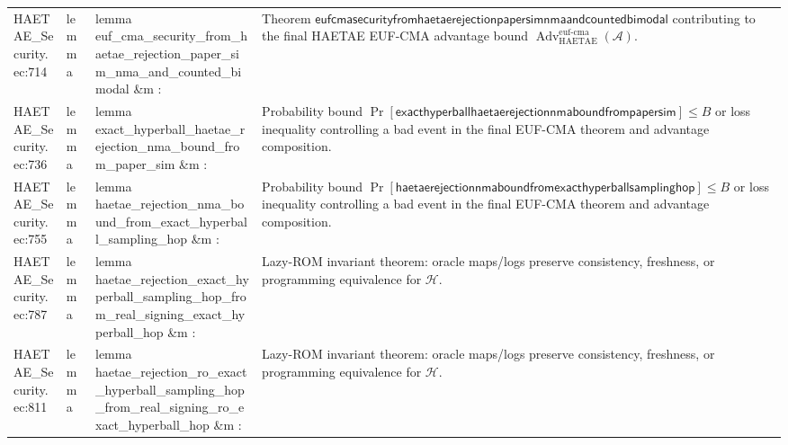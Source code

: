 \documentclass[10pt]{article}
\newcommand{\Adv}{\operatorname{Adv}}
\begin{document}
\begin{longtable}{L{0.11\textwidth}L{0.055\textwidth}L{0.385\textwidth}L{0.41\textwidth}}
HAETAE\_\allowbreak{}Security.\allowbreak{}ec:\allowbreak{}714 & lemma & {\ttfamily\scriptsize lemma euf\_\allowbreak{}cma\_\allowbreak{}security\_\allowbreak{}from\_\allowbreak{}haetae\_\allowbreak{}rejection\_\allowbreak{}paper\_\allowbreak{}sim\_\allowbreak{}nma\_\allowbreak{}and\_\allowbreak{}counted\_\allowbreak{}bimodal \&m :} & Theorem $\mathsf{eufcmasecurityfromhaetaerejectionpapersimnmaandcountedbimodal}$ contributing to the final HAETAE EUF-CMA advantage bound $\Adv_{\mathrm{HAETAE}}^{\mathrm{euf\mbox{-}cma}}(\mathcal A)$. \\
HAETAE\_\allowbreak{}Security.\allowbreak{}ec:\allowbreak{}736 & lemma & {\ttfamily\scriptsize lemma exact\_\allowbreak{}hyperball\_\allowbreak{}haetae\_\allowbreak{}rejection\_\allowbreak{}nma\_\allowbreak{}bound\_\allowbreak{}from\_\allowbreak{}paper\_\allowbreak{}sim \&m :} & Probability bound $\Pr[\mathsf{exacthyperballhaetaerejectionnmaboundfrompapersim}]\le B$ or loss inequality controlling a bad event in the final EUF-CMA theorem and advantage composition. \\
HAETAE\_\allowbreak{}Security.\allowbreak{}ec:\allowbreak{}755 & lemma & {\ttfamily\scriptsize lemma haetae\_\allowbreak{}rejection\_\allowbreak{}nma\_\allowbreak{}bound\_\allowbreak{}from\_\allowbreak{}exact\_\allowbreak{}hyperball\_\allowbreak{}sampling\_\allowbreak{}hop \&m :} & Probability bound $\Pr[\mathsf{haetaerejectionnmaboundfromexacthyperballsamplinghop}]\le B$ or loss inequality controlling a bad event in the final EUF-CMA theorem and advantage composition. \\
HAETAE\_\allowbreak{}Security.\allowbreak{}ec:\allowbreak{}787 & lemma & {\ttfamily\scriptsize lemma haetae\_\allowbreak{}rejection\_\allowbreak{}exact\_\allowbreak{}hyperball\_\allowbreak{}sampling\_\allowbreak{}hop\_\allowbreak{}from\_\allowbreak{}real\_\allowbreak{}signing\_\allowbreak{}exact\_\allowbreak{}hyperball\_\allowbreak{}hop \&m :} & Lazy-ROM invariant theorem: oracle maps/logs preserve consistency, freshness, or programming equivalence for $\mathcal H$. \\
HAETAE\_\allowbreak{}Security.\allowbreak{}ec:\allowbreak{}811 & lemma & {\ttfamily\scriptsize lemma haetae\_\allowbreak{}rejection\_\allowbreak{}ro\_\allowbreak{}exact\_\allowbreak{}hyperball\_\allowbreak{}sampling\_\allowbreak{}hop\_\allowbreak{}from\_\allowbreak{}real\_\allowbreak{}signing\_\allowbreak{}ro\_\allowbreak{}exact\_\allowbreak{}hyperball\_\allowbreak{}hop \&m :} & Lazy-ROM invariant theorem: oracle maps/logs preserve consistency, freshness, or programming equivalence for $\mathcal H$. \\

\end{longtable}
\end{document}
